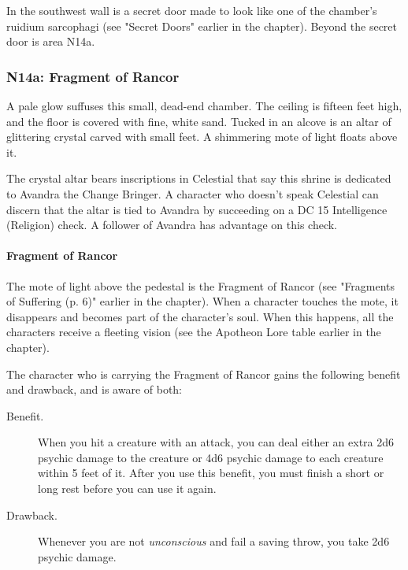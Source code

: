 \documentclass[a4paper, 11pt, bg=full, twocolumn, nooutline]{dndbook}
\begin{document}
In the southwest wall is a secret door made to look like one of the chamber's ruidium sarcophagi (see "Secret Doors" earlier in the chapter). Beyond the secret door is area N14a.

\subsubsection{N14a: Fragment of Rancor}

\begin{DndReadAloud}
A pale glow suffuses this small, dead-end chamber. The ceiling is fifteen feet high, and the floor is covered with fine, white sand. Tucked in an alcove is an altar of glittering crystal carved with small feet. A shimmering mote of light floats above it.
\end{DndReadAloud}

The crystal altar bears inscriptions in Celestial that say this shrine is dedicated to Avandra the Change Bringer. A character who doesn't speak Celestial can discern that the altar is tied to Avandra by succeeding on a DC 15 Intelligence (Religion) check. A follower of Avandra has advantage on this check.

\paragraph{Fragment of Rancor}

The mote of light above the pedestal is the Fragment of Rancor (see "Fragments of Suffering (p. 6)" earlier in the chapter). When a character touches the mote, it disappears and becomes part of the character's soul. When this happens, all the characters receive a fleeting vision (see the Apotheon Lore table earlier in the chapter).

The character who is carrying the Fragment of Rancor gains the following benefit and drawback, and is aware of both:

\begin{DndSidebar}{}
\begin{description}
\item[Benefit.] When you hit a creature with an attack, you can deal either an extra 2d6 psychic damage to the creature or 4d6 psychic damage to each creature within 5 feet of it. After you use this benefit, you must finish a short or long rest before you can use it again.
\item[Drawback.] Whenever you are not \textit{unconscious} and fail a saving throw, you take 2d6 psychic damage.
\end{description}
\end{DndSidebar}
\end{document}
